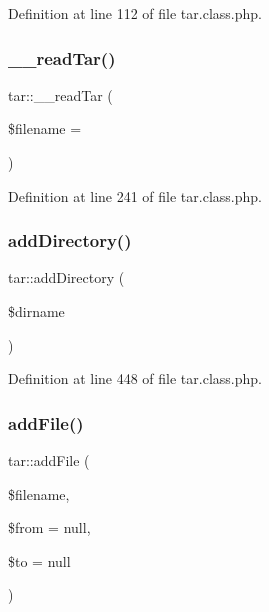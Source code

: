Definition at line 112 of file tar.\+class.\+php.

\mbox{\label{classtar_a1422972f8f5afac82f82ecab505b4079}} 
\subsubsection{\texorpdfstring{\+\_\+\+\_\+read\+Tar()}{\_\_readTar()}}
{\footnotesize\ttfamily tar\+::\+\_\+\+\_\+read\+Tar (\begin{DoxyParamCaption}\item[{}]{\$filename = {\ttfamily \textquotesingle{}\textquotesingle{}} }\end{DoxyParamCaption})}



Definition at line 241 of file tar.\+class.\+php.

\mbox{\label{classtar_a046188f5c3141d52246774c13ab2c895}} 
\subsubsection{\texorpdfstring{add\+Directory()}{addDirectory()}}
{\footnotesize\ttfamily tar\+::add\+Directory (\begin{DoxyParamCaption}\item[{}]{\$dirname }\end{DoxyParamCaption})}



Definition at line 448 of file tar.\+class.\+php.

\mbox{\label{classtar_a374a307255a5fc5110749b1e37946947}} 
\subsubsection{\texorpdfstring{add\+File()}{addFile()}}
{\footnotesize\ttfamily tar\+::add\+File (\begin{DoxyParamCaption}\item[{}]{\$filename,  }\item[{}]{\$from = {\ttfamily null},  }\item[{}]{\$to = {\ttfamily null} }\end{DoxyParamCaption})}



